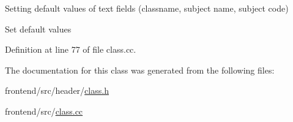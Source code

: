 Setting default values of text fields (classname, subject name, subject code) 

Set default values 

Definition at line 77 of file class.\-cc.



The documentation for this class was generated from the following files\-:\begin{DoxyCompactItemize}
\item 
frontend/src/header/\hyperlink{class_8h}{class.\-h}\item 
frontend/src/\hyperlink{class_8cc}{class.\-cc}\end{DoxyCompactItemize}
